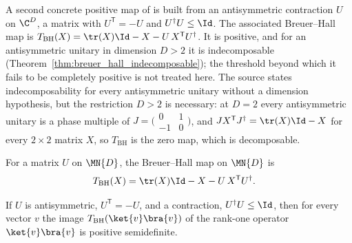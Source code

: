 A second concrete positive map of \cite[Chapter~3, Example~3.1]{Wolf2012Quantum}
is built from an antisymmetric contraction $U$ on $\C^{D}$, a matrix with
$U^{\mathsf T}=-U$ and $U^{\dagger}U\le\Id$. The associated Breuer--Hall map
\cite[Equation~(3.19)]{Wolf2012Quantum} is
$T_{\mathrm{BH}}(X)=\tr(X) \Id-X-U\,X^{\mathsf T}U^{\dagger}$.
It is positive, and for an antisymmetric unitary in dimension $D>2$ it is
indecomposable (Theorem~\ref{thm:breuer_hall_indecomposable}); the threshold
beyond which it fails to be completely positive is not treated here. The
source states indecomposability for every antisymmetric unitary without a
dimension hypothesis, but the restriction $D>2$ is necessary: at $D=2$ every
antisymmetric unitary is a phase multiple of
$J=\bigl(\begin{smallmatrix}0&1\\-1&0\end{smallmatrix}\bigr)$, and
$JX^{\mathsf T}J^{\dagger}=\tr(X)\Id-X$ for every $2\times2$ matrix $X$, so
$T_{\mathrm{BH}}$ is the zero map, which is decomposable.

\begin{definition}
    \label{def:breuer_hall_map}
    \leanok
    For a matrix $U$ on $\MN{D}$, the Breuer--Hall map on $\MN{D}$ is
    \begin{align}
        T_{\mathrm{BH}}(X) & =\tr(X) \Id-X-U\,X^{\mathsf T}U^{\dagger}.
        \notag
    \end{align}
\end{definition}

\begin{lemma}
    \label{lem:breuer_hall_rankone}
    \leanok
    If $U$ is antisymmetric, $U^{\mathsf T}=-U$, and a contraction,
    $U^{\dagger}U\le\Id$, then for every vector $v$ the image
    $T_{\mathrm{BH}}(\ket{v}\bra{v})$ of the rank-one operator $\ket{v}\bra{v}$ is
    positive semidefinite.
\end{lemma}

